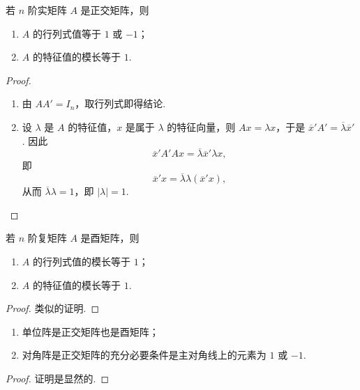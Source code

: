 \documentclass[../../main.tex]{subfiles}
\begin{document}
\begin{theorem}\label{theorem:正交矩阵的行列式和特征值}
若 $n$ 阶实矩阵 $A$ 是正交矩阵，则
\begin{enumerate}[(1)]
\item $A$ 的行列式值等于 $1$ 或 $-1$；

\item $A$ 的特征值的模长等于 $1$.
\end{enumerate}
\end{theorem}
\begin{proof}
\begin{enumerate}[(1)]
\item 由 $AA' = I_n$，取行列式即得结论.

\item 设 $\lambda$ 是 $A$ 的特征值，$x$ 是属于 $\lambda$ 的特征向量，则 $Ax = \lambda x$，于是 $\overline{x}'A' = \overline{\lambda}\overline{x}'$. 因此
\[
\overline{x}'A'Ax = \overline{\lambda}\overline{x}'\lambda x,
\]
即
\[
\overline{x}'x = \overline{\lambda}\lambda(\overline{x}'x),
\]
从而 $\overline{\lambda}\lambda = 1$，即 $|\lambda| = 1$. 
\end{enumerate}

\end{proof}

\begin{theorem}\label{theorem:酉矩阵的行列式和特征值}
若 $n$ 阶复矩阵 $A$ 是酉矩阵，则
\begin{enumerate}
\item $A$ 的行列式值的模长等于 $1$；

\item $A$ 的特征值的模长等于 $1$.
\end{enumerate}
\end{theorem}
\begin{proof}
类似的证明.

\end{proof}

\begin{proposition}\label{proposition:常见的正交矩阵和酉矩阵}
\begin{enumerate}[(1)]
\item 单位阵是正交矩阵也是酉矩阵；

\item 对角阵是正交矩阵的充分必要条件是主对角线上的元素为 $1$ 或 $-1$. 
\end{enumerate}
\end{proposition}
\begin{proof}
证明是显然的.

\end{proof}
\end{document}
